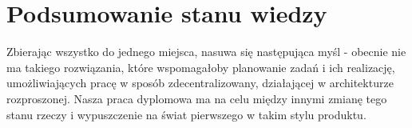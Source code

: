 \section{Podsumowanie stanu wiedzy}
\label{sec:PodsumowanieWiedzy}
Zbierając wszystko do jednego miejsca, nasuwa się następująca myśl - obecnie nie ma takiego rozwiązania, które wspomagałoby planowanie zadań i ich realizację, umożliwiających pracę w sposób zdecentralizowany, działającej w architekturze rozproszonej. Nasza praca dyplomowa ma na celu między innymi zmianę tego stanu rzeczy i wypuszczenie na świat pierwszego w takim stylu produktu.
